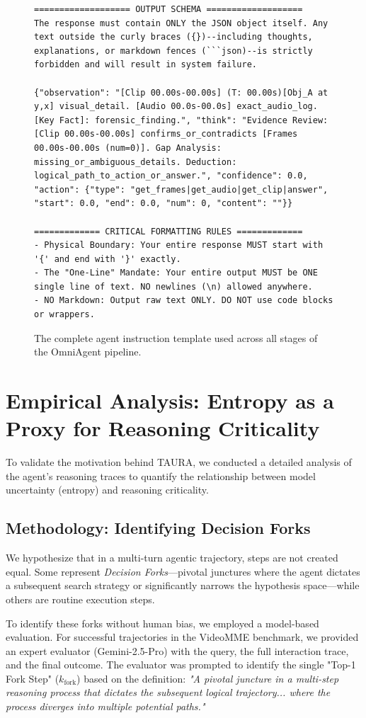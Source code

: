 \documentclass{article}
\theoremstyle{plain}
\theoremstyle{definition}
\theoremstyle{remark}
\begin{document}
\begin{figure}[H]
\begin{lstlisting}
=================== OUTPUT SCHEMA ===================
The response must contain ONLY the JSON object itself. Any text outside the curly braces ({})--including thoughts, explanations, or markdown fences (```json)--is strictly forbidden and will result in system failure.

{"observation": "[Clip 00.00s-00.00s] (T: 00.00s)[Obj_A at y,x] visual_detail. [Audio 00.0s-00.0s] exact_audio_log. [Key Fact]: forensic_finding.", "think": "Evidence Review: [Clip 00.00s-00.00s] confirms_or_contradicts [Frames 00.00s-00.00s (num=0)]. Gap Analysis: missing_or_ambiguous_details. Deduction: logical_path_to_action_or_answer.", "confidence": 0.0, "action": {"type": "get_frames|get_audio|get_clip|answer", "start": 0.0, "end": 0.0, "num": 0, "content": ""}}

============= CRITICAL FORMATTING RULES =============
- Physical Boundary: Your entire response MUST start with '{' and end with '}' exactly.
- The "One-Line" Mandate: Your entire output MUST be ONE single line of text. NO newlines (\n) allowed anywhere.
- NO Markdown: Output raw text ONLY. DO NOT use code blocks or wrappers.
\end{lstlisting}                                       
\caption{The complete agent instruction template used across all
stages of the OmniAgent pipeline.}
\label{lst:prompt}
\end{figure}

\newpage

\section{Empirical Analysis: Entropy as a Proxy for Reasoning Criticality}
\label{sec:appendix_entropy}

To validate the motivation behind TAURA, we conducted a detailed analysis of the agent's reasoning traces to quantify the relationship between model uncertainty (entropy) and reasoning criticality.

\subsection{Methodology: Identifying Decision Forks}
We hypothesize that in a multi-turn agentic trajectory, steps are not created equal. Some represent \textit{Decision Forks}---pivotal junctures where the agent dictates a subsequent search strategy or significantly narrows the hypothesis space---while others are routine execution steps.

To identify these forks without human bias, we employed a model-based evaluation. For successful trajectories in the VideoMME benchmark, we provided an expert evaluator (Gemini-2.5-Pro) with the query, the full interaction trace, and the final outcome. The evaluator was prompted to identify the single "Top-1 Fork Step" ($k_{\text{fork}}$) based on the definition: \textit{"A pivotal juncture in a multi-step reasoning process that dictates the subsequent logical trajectory... where the process diverges into multiple potential paths."}
\end{document}
